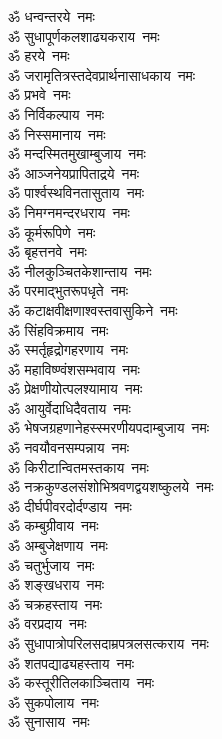 \begin{multicols}{2}
\begin{flushleft}
ॐ धन्वन्तरये~नमः\\
ॐ सुधापूर्णकलशाढ्यकराय~नमः\\
ॐ हरये~नमः\\
ॐ जरामृतित्रस्तदेवप्रार्थना\-साधकाय~नमः\\
ॐ प्रभवे~नमः\\
ॐ निर्विकल्पाय~नमः\\
ॐ निस्समानाय~नमः\\
ॐ मन्दस्मितमुखाम्बुजाय~नमः\\
ॐ आञ्जनेयप्रापिताद्रये~नमः\\
ॐ पार्श्वस्थविनतासुताय~नमः\hfill{}\\
ॐ निमग्नमन्दरधराय~नमः\\
ॐ कूर्मरूपिणे~नमः\\
ॐ बृहत्तनवे~नमः\\
ॐ नीलकुञ्चितकेशान्ताय~नमः\\
ॐ परमाद्भुतरूपधृते~नमः\\
ॐ कटाक्षवीक्षणाश्वस्त\-वासुकिने~नमः\\
ॐ सिंहविक्रमाय~नमः\\
ॐ स्मर्तृहृद्रोगहरणाय~नमः\\
ॐ महाविष्ण्वंशसम्भवाय~नमः\\
ॐ प्रेक्षणीयोत्पलश्यामाय~नमः\hfill{}\\
ॐ आयुर्वेदाधिदैवताय~नमः\\
ॐ भेषजग्रहणानेहस्स्मरणीय\-पदाम्बुजाय~नमः\\
ॐ नवयौवनसम्पन्नाय~नमः\\
ॐ किरीटान्वितमस्तकाय~नमः\\
ॐ नक्रकुण्डलसंशोभि\-श्रवणद्वयशष्कुलये~नमः\\
ॐ दीर्घपीवरदोर्दण्डाय~नमः\\
ॐ कम्बुग्रीवाय~नमः\\
ॐ अम्बुजेक्षणाय~नमः\\
ॐ चतुर्भुजाय~नमः\\
ॐ शङ्खधराय~नमः\hfill{}\\
ॐ चक्रहस्ताय~नमः\\
ॐ वरप्रदाय~नमः\\
ॐ सुधापात्रोपरिलसदाम्रपत्र\-लसत्कराय~नमः\\
ॐ शतपद्याढ्यहस्ताय~नमः\\
ॐ कस्तूरीतिलकाञ्चिताय~नमः\\
ॐ सुकपोलाय~नमः\\
ॐ सुनासाय~नमः\\

\end{flushleft}
\end{multicols}

